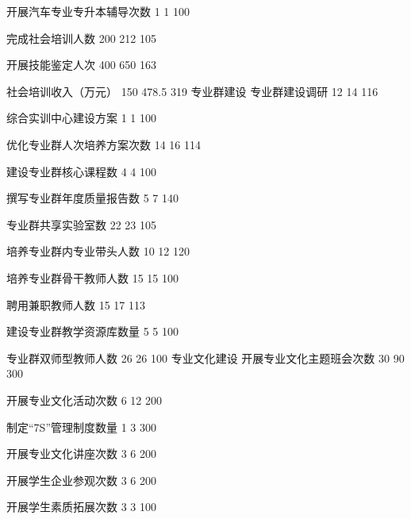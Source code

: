 开展汽车专业专升本辅导次数
1
1
100%

完成社会培训人数
200
212
105%

开展技能鉴定人次
400
650
163%

社会培训收入（万元）
150
478.5
319%
专业群建设
专业群建设调研
12
14
116%

综合实训中心建设方案
1
1
100%

优化专业群人次培养方案次数
14
16
114%

建设专业群核心课程数
4
4
100%

撰写专业群年度质量报告数
5
7
140%

专业群共享实验室数
22
23
105%

培养专业群内专业带头人数
10
12
120%

培养专业群骨干教师人数
15
15
100%

聘用兼职教师人数
15
17
113%

建设专业群教学资源库数量
5
5
100%

专业群双师型教师人数
26
26
100%
专业文化建设
开展专业文化主题班会次数
30
90
300%

开展专业文化活动次数
6
12
200%

制定“7S”管理制度数量
1
3
300%

开展专业文化讲座次数
3
6
200%

开展学生企业参观次数
3
6
200%

开展学生素质拓展次数
3
3
100%

